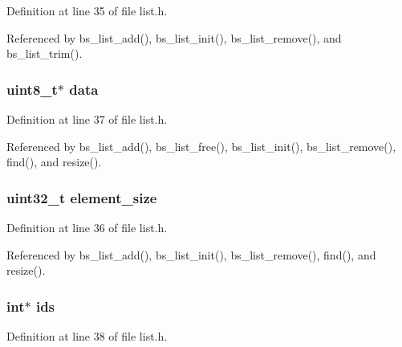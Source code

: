 Definition at line 35 of file list.\+h.



Referenced by bs\+\_\+list\+\_\+add(), bs\+\_\+list\+\_\+init(), bs\+\_\+list\+\_\+remove(), and bs\+\_\+list\+\_\+trim().

\hypertarget{struct_b_s___l_i_s_t_abe222f6d3581e7920dcad5306cc906a8}{
\subsubsection[{data}]{\setlength{\rightskip}{0pt plus 5cm}uint8\+\_\+t$\ast$ data}}\label{struct_b_s___l_i_s_t_abe222f6d3581e7920dcad5306cc906a8}


Definition at line 37 of file list.\+h.



Referenced by bs\+\_\+list\+\_\+add(), bs\+\_\+list\+\_\+free(), bs\+\_\+list\+\_\+init(), bs\+\_\+list\+\_\+remove(), find(), and resize().

\hypertarget{struct_b_s___l_i_s_t_a4ff545e181548785b8e257d2a8ac857a}{
\subsubsection[{element\+\_\+size}]{\setlength{\rightskip}{0pt plus 5cm}uint32\+\_\+t element\+\_\+size}}\label{struct_b_s___l_i_s_t_a4ff545e181548785b8e257d2a8ac857a}


Definition at line 36 of file list.\+h.



Referenced by bs\+\_\+list\+\_\+add(), bs\+\_\+list\+\_\+init(), bs\+\_\+list\+\_\+remove(), find(), and resize().

\hypertarget{struct_b_s___l_i_s_t_a6081d5fc46a8899b4beb60b0df7dd190}{
\subsubsection[{ids}]{\setlength{\rightskip}{0pt plus 5cm}int$\ast$ ids}}\label{struct_b_s___l_i_s_t_a6081d5fc46a8899b4beb60b0df7dd190}


Definition at line 38 of file list.\+h.



